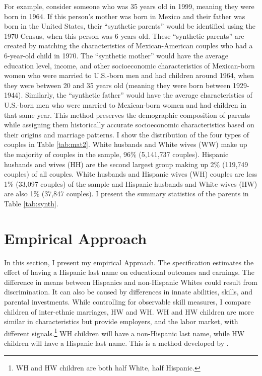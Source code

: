 For example, consider someone who was 35 years old in 1999, meaning they were born in 1964. If this person's mother was born in Mexico and their father was born in the United States, their ``synthetic parents'' would be identified using the 1970 Census, when this person was 6 years old. These ``synthetic parents'' are created by matching the characteristics of Mexican-American couples who had a 6-year-old child in 1970. The ``synthetic mother'' would have the average education level, income, and other socioeconomic characteristics of Mexican-born women who were married to U.S.-born men and had children around 1964, when they were between 20 and 35 years old (meaning they were born between 1929-1944). Similarly, the ``synthetic father'' would have the average characteristics of U.S.-born men who were married to Mexican-born women and had children in that same year. This method preserves the demographic composition of parents while assigning them historically accurate socioeconomic characteristics based on their origins and marriage patterns.
I show the distribution of the four types of couples in Table \ref{tab:mat2}. White husbands and White wives (WW) make up the majority of couples in the sample, 96\% (5,141,737 couples). Hispanic husbands and wives (HH) are the second largest group making up 2\% (119,749 couples) of all couples. White husbands and Hispanic wives (WH) couples are less 1\% (33,097 couples) of the sample and Hispanic husbands and White wives (HW) are also 1\% (37,847 couples). I present the summary statistics of the parents in Table \ref{tab:synth}.

\section{Empirical Approach}\label{sec:emp_model}

In this section, I present my empirical Approach. The specification estimates the effect of having a Hispanic last name on educational outcomes and earnings. The difference in means between Hispanics and non-Hispanic Whites could result from discrimination. It can also be caused by differences in innate abilities, skills, and parental investments. While controlling for observable skill measures, I compare children of inter-ethnic marriages, HW and WH. WH and HW children are more similar in characteristics but provide employers, and the labor market, with different signals.\footnote{WH and HW children are both half White, half Hispanic.} WH children will have a non-Hispanic last name, while HW children will have a Hispanic last name. This is a method developed by \textcite{rubinstein2014pride}.

